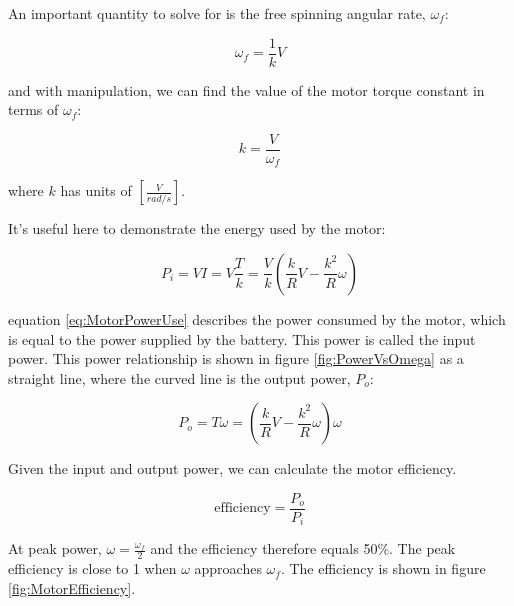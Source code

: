 An important quantity to solve for is the free spinning angular rate, $\omega_{f}$:

\begin{equation}
\omega_{f} = \frac{1}{k}V
\label{eq:FreeSpinningOmega}
\end{equation}

and with manipulation, we can find the value of the motor torque constant in terms of $\omega_{f}$:

\begin{equation}
k = \frac{V}{\omega_{f}}
\label{eq:MotorTorqueConstant}
\end{equation}

where $k$ has units of $[\frac{V}{rad/s}]$.

It's useful here to demonstrate the energy used by the motor:

\begin{equation}
P_{i} = VI = V\frac{T}{k} = \frac{V}{k}\left(\frac{k}{R}V - \frac{k^2}{R}\omega\right)
\label{eq:MotorPowerUse}
\end{equation}

equation \ref{eq:MotorPowerUse} describes the power consumed by the motor, which is equal to the power supplied by the battery. This power is called the input power. This power relationship is shown in figure \ref{fig:PowerVsOmega} as a straight line, where the curved line is the output power, $P_{o}$:

\begin{equation}
P_{o} = T\omega= \left(\frac{k}{R}V - \frac{k^2}{R}\omega\right)\omega
\label{eq:MotorPowerOutput}
\end{equation}

Given the input and output power, we can calculate the motor efficiency.

\begin{equation}
\mbox{efficiency} = \frac{P_{o}}{P_{i}}
\label{eq:MotorEfficiency}
\end{equation}

At peak power, $\omega = \frac{\omega_{f}}{2}$ and the efficiency therefore equals 50\%. The peak efficiency is close to 1 when $\omega$ approaches $\omega_{f}$. The efficiency is shown in figure \ref{fig:MotorEfficiency}.

